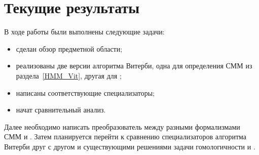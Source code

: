 \section{Текущие результаты}
В ходе работы были выполнены следующие задачи:
\begin{itemize}
	\item сделан обзор предметной области;
	\item реализованы две версии алгоритма Витерби, одна для определения СММ из раздела~\ref{HMM_Vit}, другая для ;
	\item написаны соответствующие специализаторы;
	\item начат сравнительный анализ.
\end{itemize}


Далее необходимо написать преобразователь между разными 
формализмами СММ и .
Затем планируется перейти к сравнению специализаторов 
алгоритма Витерби друг с другом и существующими решениями 
задачи гомологичности  и .

